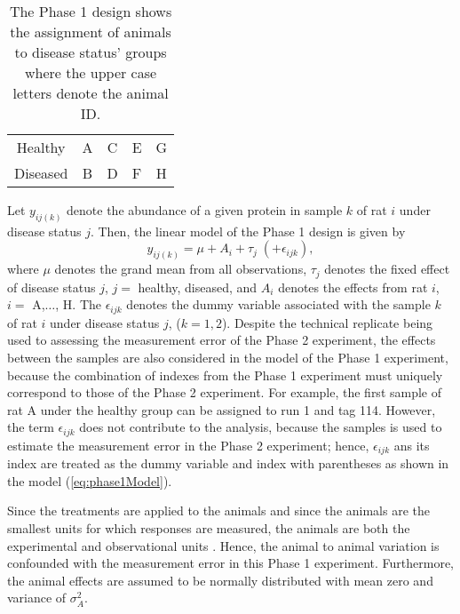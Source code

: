 \documentclass[article]{jss}
\begin{document}
\begin{table}[ht]
\centering
\caption{The Phase 1 design shows the assignment of animals to disease status' groups where the upper case letters denote the animal ID.}
\begin{tabular}[t]{ccccc}
\hline 
Healthy & A & C & E & G \\ 
Diseased & B & D & F & H \\ 
\hline 
\end{tabular} 
\label{tab:phase1Design}
\end{table}

Let $y_{ij(k)}$ denote the abundance of a given protein in sample $k$ of rat $i$ under disease status $j$. Then, the linear model of the Phase 1 design is given by
\begin{equation}\label{eq:phase1Model}
y_{ij(k)}= \mu + A_{i} + \tau_{j} \; (+ \epsilon_{ijk} ),
\end{equation}
where $\mu$ denotes the grand mean from all observations, $\tau_{j}$ denotes the fixed effect of disease status $j$, $j=$ healthy, diseased, and $A_{i}$ denotes the effects from rat $i$, $i=$ A,$\dots$, H. The $\epsilon_{ijk}$ denotes the dummy variable associated with the sample $k$ of rat $i$ under disease status $j$, ($k = 1, 2$). Despite the technical replicate being used to assessing the measurement error of the Phase 2 experiment, the effects between the samples are also considered in the model of the Phase 1 experiment, because the combination of indexes from the Phase 1 experiment must uniquely correspond to those of the Phase 2 experiment. For example, the first sample of rat A under the healthy group can be assigned to run 1 and tag 114. However, the term $\epsilon_{ijk}$ does not contribute to the analysis, because the samples is used to estimate the measurement error in the Phase 2 experiment; hence, $\epsilon_{ijk}$ ans its index are treated as the dummy variable and index with parentheses as shown in the model (\ref{eq:phase1Model}). 

Since the treatments are applied to the animals and since the animals are the smallest units for which responses are measured, the animals are both the experimental and observational units \citep{Bailey2008}. Hence, the animal to animal variation is confounded with the measurement error in this Phase 1 experiment. Furthermore, the animal effects are assumed to be normally distributed with mean zero and variance of $\sigma_{A}^2$.
\end{document}
